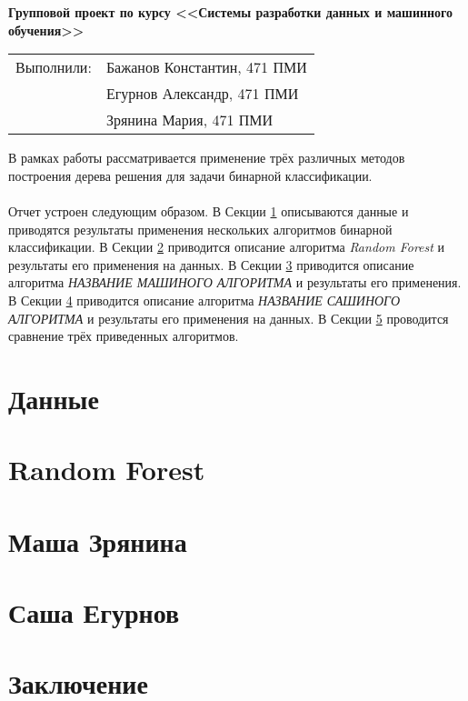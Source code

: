 \documentclass[12pt,a4paper]{article}
\begin{document}
\begin{center}
    \Large \bf Групповой проект по курсу <<Системы разработки данных и машинного обучения>>
\end{center}

\begin{flushleft}
    \begin{tabular}[H]{ll}
        Выполнили: & Бажанов Константин, 471 ПМИ\\
        &Егурнов Александр, 471 ПМИ\\
        &Зрянина Мария, 471 ПМИ\\
    \end{tabular}
\end{flushleft}

В рамках работы рассматривается применение трёх различных методов построения дерева решения для задачи бинарной классификации.\\\\
Отчет устроен следующим образом. В Секции \ref{sec:data} описываются данные и приводятся результаты применения нескольких алгоритмов бинарной классификации.
В Секции \ref{sec:randomforest} приводится описание алгоритма {\it Random Forest} и результаты его применения на данных.
В Секции \ref{sec:mashazryanina} приводится описание алгоритма {\it НАЗВАНИЕ МАШИНОГО АЛГОРИТМА} и результаты его применения.
В Секции \ref{sec:sashaegurnov} приводится описание алгоритма {\it НАЗВАНИЕ САШИНОГО АЛГОРИТМА} и результаты его применения на данных.
В Секции \ref{sec:conclusion} проводится сравнение трёх приведенных алгоритмов.

\section{Данные}
\label{sec:data}

\section{Random Forest}
\label{sec:randomforest}

\section{Маша Зрянина}
\label{sec:mashazryanina}

\section{Саша Егурнов}
\label{sec:sashaegurnov}

\section{Заключение}
\label{sec:conclusion}



\end{document}
